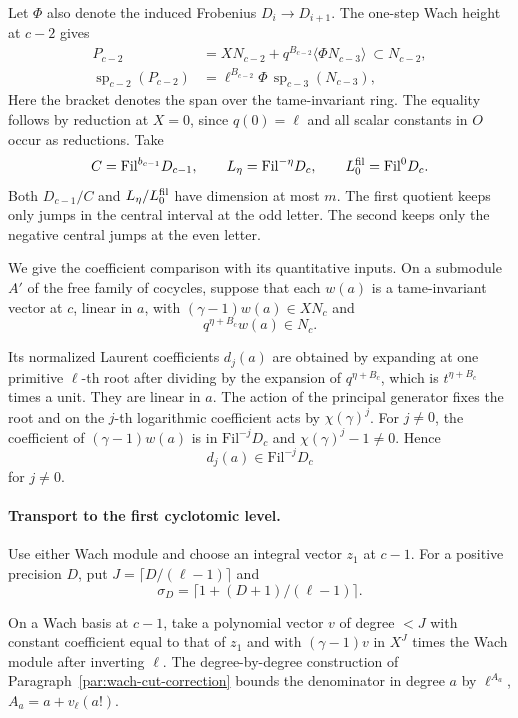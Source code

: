 Let \(\Phi\) also denote the induced Frobenius \(D_i\to D_{i+1}\).
The one-step Wach height at \(c-2\) gives
\[
\begin{aligned}
 P_{c-2}&=XN_{c-2}+q^{B_{c-2}}\langle\Phi N_{c-3}\rangle
                 \ \subset N_{c-2},\\
 \operatorname{sp}_{c-2}(P_{c-2})
       &=\ell^{B_{c-2}}\Phi\,\operatorname{sp}_{c-3}(N_{c-3}),
\end{aligned}
\]
Here the bracket denotes the span over the tame-invariant ring.
The equality follows by reduction at \(X=0\), since \(q(0)=\ell\)
and all scalar constants in \(O\) occur as reductions.
Take
\[
  C=\mathrm{Fil}^{b_{c-1}}D_{c-1},\qquad
  L_\eta=\mathrm{Fil}^{-\eta}D_c,\qquad L_0^{\rm fil}=\mathrm{Fil}^0 D_c .
\]
Both \(D_{c-1}/C\) and \(L_\eta/L_0^{\rm fil}\) have dimension at most
\(m\). The first quotient keeps only jumps in the central interval at
the odd letter. The second keeps only the negative central jumps at
the even letter.

We give the coefficient comparison with its quantitative inputs.
On a submodule \(A'\) of the free family of cocycles, suppose that each
\(w(a)\) is a tame-invariant vector at \(c\), linear in \(a\), with
\((\gamma-1)w(a)\in XN_c\) and
\[
 q^{\eta+B_c}w(a)\in N_c.
\]

Its normalized Laurent coefficients \(d_j(a)\) are obtained by
expanding at one primitive \(\ell\)-th root after dividing by the
expansion of \(q^{\eta+B_c}\), which is \(t^{\eta+B_c}\) times a
unit. They are linear in \(a\). The action of the principal generator
fixes the root and on the \(j\)-th logarithmic coefficient acts by
\(\chi(\gamma)^j\). For \(j\ne 0\), the coefficient of
\((\gamma-1)w(a)\) is in \(\mathrm{Fil}^{-j}D_c\) and
\(\chi(\gamma)^j-1\ne0\). Hence
\[
 d_j(a)\in\mathrm{Fil}^{-j}D_c
\]
for \(j\ne0\).

\paragraph{Transport to the first cyclotomic level.}
Use either Wach module and choose an integral vector \(z_1\)
at \(c-1\). For a positive precision \(D\), put
\(J=\lceil D/(\ell-1)\rceil\) and
\[
 \sigma_D=\lceil 1+(D+1)/(\ell-1)\rceil.
\]

On a Wach basis at \(c-1\), take a polynomial vector \(v\)
of degree \(<J\) with constant coefficient equal to that of
\(z_1\) and with \((\gamma-1)v\) in \(X^J\) times the Wach
module after inverting \(\ell\).
The degree-by-degree construction of
Paragraph~\ref{par:wach-cut-correction} bounds the denominator
in degree \(a\) by \(\ell^{A_a}\), \(A_a=a+v_\ell(a!)\).

